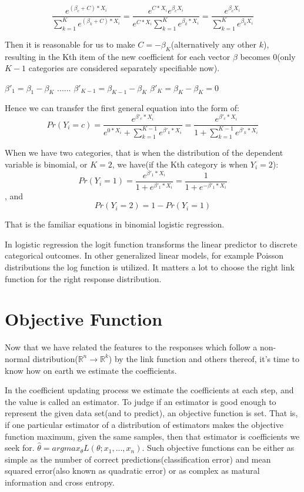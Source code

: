 \documentclass[a4paper]{article}
\begin{document}
$$\frac{e^{(\beta_c+C)*X_i}}{\sum^K_{k=1}e^{(\beta_k+C)*X_i}}=\frac{e^{C*X_i}e^{\beta_cX_i}}{e^{C*X_i}\sum^K_{k=1}e^{\beta_k*X_i}}=\frac{e^{\beta_cX_i}}{\sum^K_{k=1}e^{\beta_kX_i}}$$

Then it is reasonable for us to make $C=-\beta_K$(alternatively any other $k$), resulting in the Kth item of the new coefficient for each vector $\beta$ becomes 0(only $K-1$ categories are considered separately specifiable now).  

$\beta'_1=\beta_1-\beta_K$    
......    
$\beta'_{K-1}=\beta_{K-1}-\beta_K$     
$\beta'_K=\beta_K-\beta_K=0$

Hence we can transfer the first general equation into the form of:   
$$Pr(Y_i=c) = \frac{e^{\beta'_c*X_i}}{e^{0*X_i}+\sum^{K-1}_{k=1}e^{\beta'_k*X_i}} = \frac{e^{\beta'_c*X_i}}{1+\sum^{K-1}_{k=1}e^{\beta'_k*X_i}}$$

When we have two categories, that is when the distribution of the dependent variable is binomial, or $K=2$, we have(if the Kth category is when $Y_i=2$):   
$$Pr(Y_i=1) = \frac{e^{\beta'_1*X_i}}{1+e^{\beta'_1*X_i}}=\frac{1}{1+e^{-\beta'_1*X_i}}$$, and 
$$Pr(Y_i=2) = 1-Pr(Y_i=1)$$

That is the familiar equations in binomial logistic regression. 

In logistic regression the logit function transforms the linear predictor to discrete categorical outcomes. In other generalized linear models, for example Poisson distributions the log function is utilized. It matters a lot to choose the right link function for the right response distribution.

\section{Objective Function}
Now that we have related the features to the responses which follow a non-normal distribution($\mathbb{R}^n \rightarrow \mathbb{R}^k$) by the link function and others thereof, it's time to know how on earth we estimate the coefficients.

In the coefficient updating process we estimate the coefficients at each step, and the value is called an estimator. To judge if an estimator is good enough to represent the given data set(and to predict), an objective function is set. That is, if one particular estimator of a distribution of estimators makes the objective function maximum, given the same samples, then that estimator is coefficients we seek for. $\hat \theta = argmax_\theta L(\theta; x_1,...,x_n)$. Such objective functions can be either as simple as the number of correct predictions(classification error) and mean squared error(also known as quadratic error) or as complex as matural information and cross entropy.
\end{document}
